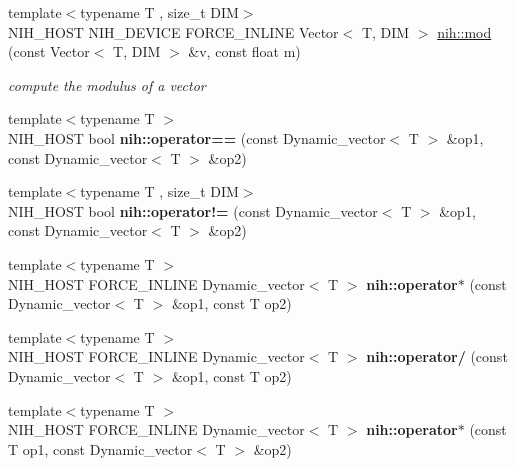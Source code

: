 \begin{DoxyCompactItemize}
{\footnotesize template$<$typename T , size\-\_\-t \-D\-I\-M$>$ }\\\-N\-I\-H\-\_\-\-H\-O\-S\-T \-N\-I\-H\-\_\-\-D\-E\-V\-I\-C\-E \*
\-F\-O\-R\-C\-E\-\_\-\-I\-N\-L\-I\-N\-E \-Vector$<$ \-T, \-D\-I\-M $>$ \hyperlink{group__vectors_ga278bc40e135ff21dd4c80375feccc703}{nih\-::mod} (const \-Vector$<$ \-T, \-D\-I\-M $>$ \&v, const float m)
\begin{DoxyCompactList}\small\item\em compute the modulus of a vector \end{DoxyCompactList}\item 
\hypertarget{group__vectors_ga42ddf0baa76ea97ab1ba69f017746b64}{
{\footnotesize template$<$typename T $>$ }\\\-N\-I\-H\-\_\-\-H\-O\-S\-T bool {\bfseries nih\-::operator==} (const \-Dynamic\-\_\-vector$<$ \-T $>$ \&op1, const \-Dynamic\-\_\-vector$<$ \-T $>$ \&op2)}
\label{group__vectors_ga42ddf0baa76ea97ab1ba69f017746b64}

\item 
\hypertarget{group__vectors_ga19ea070e035fcdc97bbab34cdfde4c10}{
{\footnotesize template$<$typename T , size\-\_\-t \-D\-I\-M$>$ }\\\-N\-I\-H\-\_\-\-H\-O\-S\-T bool {\bfseries nih\-::operator!=} (const \-Dynamic\-\_\-vector$<$ \-T $>$ \&op1, const \-Dynamic\-\_\-vector$<$ \-T $>$ \&op2)}
\label{group__vectors_ga19ea070e035fcdc97bbab34cdfde4c10}

\item 
\hypertarget{group__vectors_gad6b82f45e24cda7119205693d7235750}{
{\footnotesize template$<$typename T $>$ }\\\-N\-I\-H\-\_\-\-H\-O\-S\-T \-F\-O\-R\-C\-E\-\_\-\-I\-N\-L\-I\-N\-E \*
\-Dynamic\-\_\-vector$<$ \-T $>$ {\bfseries nih\-::operator$\ast$} (const \-Dynamic\-\_\-vector$<$ \-T $>$ \&op1, const \-T op2)}
\label{group__vectors_gad6b82f45e24cda7119205693d7235750}

\item 
\hypertarget{group__vectors_ga866cbec9ab0c98fda2dd23d72fa3394c}{
{\footnotesize template$<$typename T $>$ }\\\-N\-I\-H\-\_\-\-H\-O\-S\-T \-F\-O\-R\-C\-E\-\_\-\-I\-N\-L\-I\-N\-E \*
\-Dynamic\-\_\-vector$<$ \-T $>$ {\bfseries nih\-::operator/} (const \-Dynamic\-\_\-vector$<$ \-T $>$ \&op1, const \-T op2)}
\label{group__vectors_ga866cbec9ab0c98fda2dd23d72fa3394c}

\item 
\hypertarget{group__vectors_gaa682bf56e1568bea95c4a02ef638ed42}{
{\footnotesize template$<$typename T $>$ }\\\-N\-I\-H\-\_\-\-H\-O\-S\-T \-F\-O\-R\-C\-E\-\_\-\-I\-N\-L\-I\-N\-E \*
\-Dynamic\-\_\-vector$<$ \-T $>$ {\bfseries nih\-::operator$\ast$} (const \-T op1, const \-Dynamic\-\_\-vector$<$ \-T $>$ \&op2)}
\label{group__vectors_gaa682bf56e1568bea95c4a02ef638ed42}


\end{DoxyCompactItemize}
